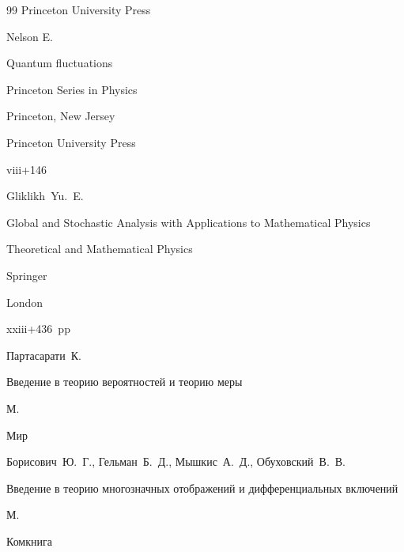\begin{thebibliography}{99}
\publ Princeton University Press







\by Nelson E.

\book Quantum fluctuations

\serial Princeton Series in Physics

\publaddr Princeton, New Jersey

\publ Princeton University Press

\totalpages viii+146 





\by Gliklikh~Yu.~E. 

\book  Global and Stochastic Analysis with Applications to Mathematical Physics

\serial Theoretical and Mathematical Physics

\publ Springer

\publaddr London 


\totalpages xxiii+436~pp \nofrills





\by Партасарати~К.

\book Введение в теорию вероятностей и теорию меры 

\publaddr М.

\publ Мир 






\by Борисович~Ю.~Г., Гельман~Б.~Д., Мышкис~А.~Д., Обуховский~В.~В. 

\book Введение в теорию многозначных отображений и дифференциальных включений 

\publaddr М. 

\publ Комкнига 






\end{thebibliography}

